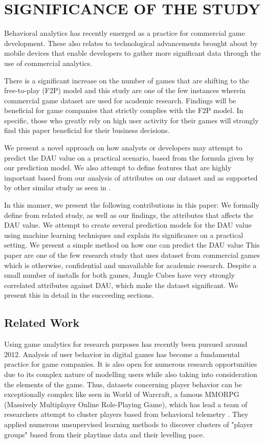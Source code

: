 %
%
%
\section{SIGNIFICANCE OF THE STUDY}
Behavioral analytics has recently emerged as a practice for commercial game development. These also relates to technological advancements brought about by mobile devices that enable developers to gather more significant data through the use of commercial analytics.

There is a significant increase on the number of games that are shifting to the free-to-play (F2P) model and this study are one of the few instances wherein commercial game dataset are used for academic research. Findings will be beneficial for game companies that strictly complies with the F2P model. In specific, those who greatly rely on high user activity for their games will strongly find this paper beneficial for their business decisions.

We present a novel approach on how analysts or developers may attempt to predict the DAU value on a practical scenario, based from the formula given by our prediction model. We also attempt to define features that are highly important based from our analysis of attributes on our dataset and as supported by other similar study as seen in \cite{ref:predicting_player_churn}.

In this manner, we present the following contributions in this paper:
We formally define from related study, as well as our findings,  the attributes that affects the DAU value.
We attempt to create several prediction models for the DAU value using machine learning techniques and explain its significance on a practical setting.
We present a simple method on how one can predict the DAU value
This paper are one of the few research study that uses dataset from commercial games which is otherwise, confidential and unavailable for academic research.
Despite a small number of installs for both games, Jungle Cubes have very strongly correlated attributes against DAU, which make the dataset significant. We present this in detail in the succeeding sections.

\subsection{Related Work}
Using game analytics for research purposes has recently been pursued around 2012.  Analysis of user behavior in digital games has become a fundamental practice for game companies. It is also open for numerous research opportunities due to its complex nature of modelling users while also taking into consideration the elements of the game. Thus, datasets concerning player behavior can be exceptionally complex like seen in World of Warcraft, a famous MMORPG (Massively Multiplayer Online Role-Playing Game), which has lead a team of researchers attempt to cluster players based from behavioral telemetry \cite{ref:player_clustering_wow}. They applied numerous unsupervised learning methods to discover clusters of "player groups" based from their playtime data and their levelling pace.

